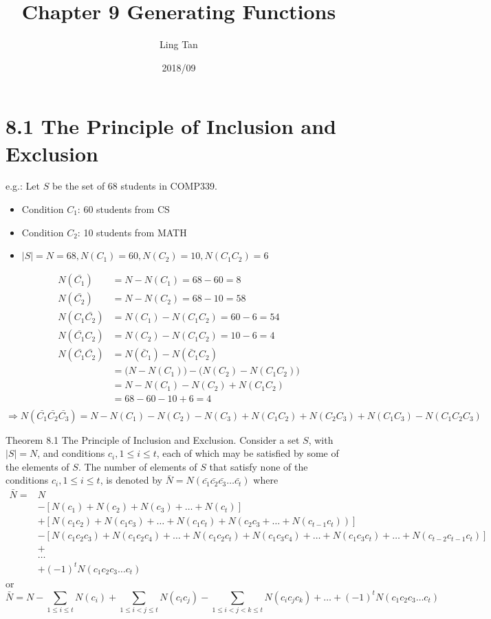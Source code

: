 \documentclass[a4paper]{article}
\title{Chapter 9 Generating Functions}
\author{Ling Tan}
\date{2018/09}
\begin{document}
\maketitle

\section*{8.1 The Principle of Inclusion and Exclusion}
\color{red}e.g.: \color{black} Let $S$ be the set of 68 students in COMP339.\\
\begin{itemize}
    \item Condition $C_1$: 60 students from CS
    \item Condition $C_2$: 10 students from MATH
    \item $|S|=N=68, N(C_1)=60, N(C_2)=10, N(C_1C_2)=6$
\end{itemize}
\begin{align*}
N(\bar{C_1})& =N-N(C_1)=68-60=8\\
N(\bar{C_2})& =N-N(C_2)=68-10=58\\
N(C_1\bar{C_2})& =N(C_1)-N(C_1C_2)=60-6=54\\
N(\bar{C_1}{C_2})& =N(C_2)-N(C_1C_2)=10-6=4\\
N(\bar{C_1}\bar{C_2})& =N(\bar C_1)-N(\bar C_1C_2)\\
&=\bigl(N-N(C_1)\bigr)-\bigl(N(C_2)-N(C_1C_2)\bigr)\\
&=N-N(C_1)-N(C_2)+N(C_1C_2)\\
&=68-60-10+6=4\\
\end{align*}
$\Rightarrow N(\bar{C_1}\bar{C_2}\bar{C_3})=N-N(C_1)-N(C_2)-N(C_3)+N(C_1C_2)+N(C_2C_3)+N(C_1C_3)-N(C_1C_2C_3)$

\color{green}Theorem 8.1 \color{black} The Principle of Inclusion and Exclusion. Consider a set $S$, with $|S|=N$, and conditions $c_i,1\leq i\leq t$, each of which may be satisfied by some of the elements of $S$. The number of elements of $S$ that satisfy none of the conditions $c_i,1\leq i\leq t$, is 
denoted by $\bar {N}=N(\bar { c_1} \bar { c_2} \bar { c_3} \dots \bar { c_t})$ where
\begin{align*}
\bar {N} = & N\\
& -[N(c_1)+N(c_2)+N(c_3)+\dots + N(c_t)] \\
& +  [N(c_1 c_2)+N(c_1 c_3)+\dots+N(c_1 c_t)+N(c_2 c_3+\dots+N(c_{t-1} c_t))]\\ 
& -  [N(c_1 c_2 c_3)+N(c_1 c_2 c_4)+\dots+N(c_1 c_2 c_t)+N(c_1 c_3 c_4)+\dots+N(c_1 c_3 c_t)+\dots +N(c_{t-2} c_{t-1} c_t)]\\ 
& + \\
& \dots \\
& + (-1)^t N(c_1 c_2 c_3 \dots c_t)
\end{align*}
or
$$
\bar {N} = N - \sum_{1\leq i \leq t} N(c_i) + \sum_{1\leq i < j \leq t} N(c_i c_j) - \sum_{1\leq i < j < k \leq t} N(c_i c_j c_k) +  \dots + (-1)^t N(c_1 c_2 c_3 \dots c_t)
$$
\end{document}
